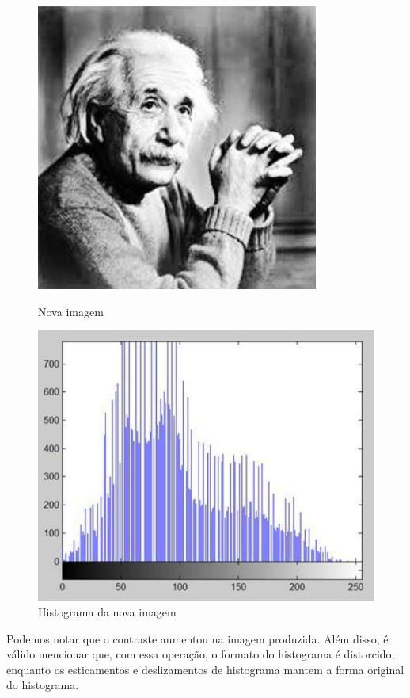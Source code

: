\documentclass[a4paper, 12pt]{article}
\begin{document}
\begin{figure}[!htb]
	\centering
	  \includegraphics[width=\linewidth]{images/novo.png}
	  \caption{Nova imagem}
	\endminipage\hspace{1cm}
	  \includegraphics[scale=0.3]{images/velhoHist.png}
	  \caption{Histograma da nova imagem}
	\endminipage
\end{figure}
Podemos notar que o contraste aumentou na imagem produzida. Além disso, é válido mencionar que, com essa operação, o formato do histograma é distorcido, 
enquanto os esticamentos e deslizamentos de histograma mantem a forma original do histograma.
\end{document}
